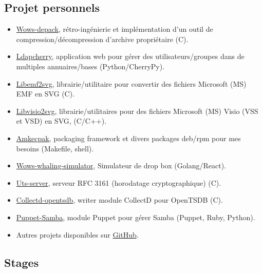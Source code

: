 \documentclass[10pt,a4paper,sans]{moderncv}        %
\begin{document}
\subsection{Projet personnels}
        {}
        {}
        {}
        {
            \begin{itemize}
            \item \href{https://github.com/wows-tools/wows-depack}{Wows-depack}, rétro-ingénierie et implémentation d'un outil de compression/décompression d'archive propriétaire (C).
            \item \href{https://github.com/kakwa/ldapcherry}{Ldapcherry}, application web pour gérer des utilisateurs/groupes dans de multiples annuaires/bases (Python/CherryPy).
            \item \href{https://github.com/kakwa/libemf2svg}{Libemf2svg}, librairie/utilitaire pour convertir des fichiers Microsoft (MS) EMF en SVG (C).
            \item \href{https://github.com/kakwa/libvisio2svg}{Libvisio2svg}, librairie/utilitaires pour des fichiers Microsoft (MS) Visio (VSS et VSD) en SVG, (C/C++).
            \item \href{https://github.com/kakwa/amkecpak}{Amkecpak}, packaging framework et divers packages deb/rpm pour mes besoins (Makefile, shell).
            \item \href{https://github.com/wows-tools/wows-whaling-simulator}{Wows-whaling-simulator}, Simulateur de drop box (Golang/React).
            \item \href{https://github.com/kakwa/uts-server}{Uts-server}, serveur RFC 3161 (horodatage cryptographique) (C).
            \item \href{https://github.com/kakwa/collectd-opentsdb}{Collectd-opentsdb}, writer module CollectD pour OpenTSDB (C).
            \item \href{https://github.com/kakwa/puppet-samba}{Puppet-Samba}, module Puppet pour gérer Samba (Puppet, Ruby, Python).
            \item Autres projets disponibles sur \href{https://github.com/kakwa?tab=repositories&q=&type=&language=&sort=stargazers}{GitHub}.
            \end{itemize}
        }

\subsection{Stages}
\end{document}
